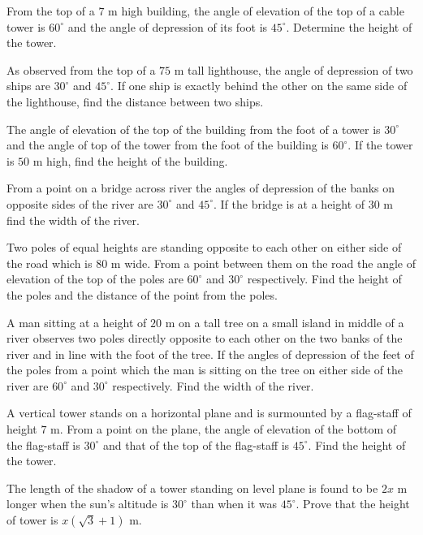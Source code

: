 \item From the top of a $7$ m high building, the angle of elevation of the top of a cable tower is $60^\circ$ and the
  angle of depression of its foot is $45^\circ$. Determine the height of the tower.

\item As observed from the top of a $75$ m tall lighthouse, the angle of depression of two ships are $30^\circ$ and
  $45^\circ$. If one ship is exactly behind the other on the same side of the lighthouse, find the distance between two
  ships.

\item The angle of elevation of the top of the building from the foot of a tower is $30^\circ$ and the angle of top of the
  tower from the foot of the building is $60^\circ$. If the tower is $50$ m high, find the height of the building.

\item From a point on a bridge across river the angles of depression of the banks on opposite sides of the river are $30^\circ$
  and $45^\circ$. If the bridge is at a height of $30$ m find the width of the river.

\item Two poles of equal heights are standing opposite to each other on either side of the road which is $80$ m wide. From a
  point between them on the road the angle of elevation of the top of the poles are $60^\circ$ and $30^\circ$
  respectively. Find the height of the poles and the distance of the point from the poles.

\item A man sitting at a height of $20$ m on a tall tree on a small island in middle of a river observes two poles directly
  opposite to each other on the two banks of the river and in line with the foot of the tree. If the angles of depression of the
  feet of the poles from a point which the man is sitting on the tree on either side of the river are $60^\circ$ and
  $30^\circ$ respectively. Find the width of the river.

\item A vertical tower stands on a horizontal plane and is surmounted by a flag-staff of height $7$ m. From a point on the
  plane, the angle of elevation of the bottom of the flag-staff is $30^\circ$ and that of the top of the flag-staff is
  $45^\circ$. Find the height of the tower.

\item The length of the shadow of a tower standing on level plane is found to be $2x$ m longer when the sun's altitude is
  $30^\circ$ than when it was $45^\circ$. Prove that the height of tower is $x(\sqrt{3} + 1)$ m.

